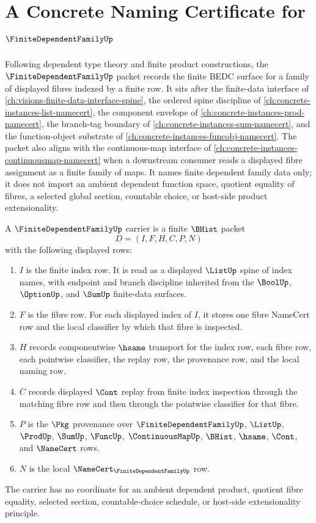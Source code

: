 \chapter{A Concrete Naming Certificate for $\FiniteDependentFamilyUp$}
\label{ch:concrete-instances-finite-dependent-family-namecert}

Following dependent type theory and finite product constructions, the $\FiniteDependentFamilyUp$ packet records the finite BEDC surface for a family of displayed fibres indexed by a finite row. It sits after the finite-data interface of \autoref{ch:visions-finite-data-interface-spine}, the ordered spine discipline of \autoref{ch:concrete-instances-list-namecert}, the component envelope of \autoref{ch:concrete-instances-prod-namecert}, the branch-tag boundary of \autoref{ch:concrete-instances-sum-namecert}, and the function-object substrate of \autoref{ch:concrete-instances-funcobj-namecert}. The packet also aligns with the continuous-map interface of \autoref{ch:concrete-instances-continuousmap-namecert} when a downstream consumer reads a displayed fibre assignment as a finite family of maps. It names finite dependent family data only; it does not import an ambient dependent function space, quotient equality of fibres, a selected global section, countable choice, or host-side product extensionality.

\begin{definition}
\label{def:finite-dependent-family-carrier}
A $\FiniteDependentFamilyUp$ carrier is a finite $\BHist$ packet
$$
D=(I,F,H,C,P,N)
$$
with the following displayed rows:
\begin{enumerate}
\item $I$ is the finite index row. It is read as a displayed $\ListUp$ spine of index names, with endpoint and branch discipline inherited from the $\BoolUp$, $\OptionUp$, and $\SumUp$ finite-data surfaces.
\item $F$ is the fibre row. For each displayed index of $I$, it stores one fibre NameCert row and the local classifier by which that fibre is inspected.
\item $H$ records componentwise $\hsame$ transport for the index row, each fibre row, each pointwise classifier, the replay row, the provenance row, and the local naming row.
\item $C$ records displayed $\Cont$ replay from finite index inspection through the matching fibre row and then through the pointwise classifier for that fibre.
\item $P$ is the $\Pkg$ provenance over $\FiniteDependentFamilyUp$, $\ListUp$, $\ProdUp$, $\SumUp$, $\FuncUp$, $\ContinuousMapUp$, $\BHist$, $\hsame$, $\Cont$, and $\NameCert$ rows.
\item $N$ is the local $\NameCert_{\FiniteDependentFamilyUp}$ row.
\end{enumerate}
The carrier has no coordinate for an ambient dependent product, quotient fibre equality, selected section, countable-choice schedule, or host-side extensionality principle.
\end{definition}

